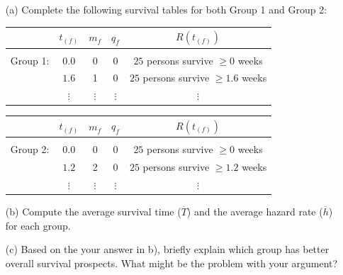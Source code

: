 \documentclass[12pt]{article}
\begin{document}
\begin{itemize}
	\item[(a)] Complete the following survival tables  for both Group 1 and Group 2: \\

\begin{center}
\begin{tabular}{ c c c c c }
 & $t_{(f)}$ & $m_{f}$ & $q_{f}$ & $R(t_{(f)})$ \\
 \hline \\
 Group 1: & $0.0$ & $0$ & $0$ & $25$ persons survive $\geq 0$ weeks \\
 & $1.6$ &1  &0  & $25$ persons survive $\geq 1.6$ weeks \\
 & $\vdots$ & $\vdots$ & $\vdots$ & $\vdots$
\end{tabular}
\end{center}

\begin{center}
\begin{tabular}{ c c c c c }
 & $t_{(f)}$ & $m_{f}$ & $q_{f}$ & $R(t_{(f)})$ \\
 \hline \\
 Group 2: & $0.0$ & $0$ & $0$ & $25$ persons survive $\geq 0$ weeks \\
 & $1.2$ &2  &0  & $25$ persons survive $\geq 1.2$ weeks \\
 & $\vdots$ & $\vdots$ & $\vdots$ & $\vdots$
\end{tabular}
\end{center}

	
	\item[(b)] Compute the average survival time ($\overline{T}$) and the average hazard rate ($\overline{h}$) for each group.
	
	\item[(c)] Based on the your answer in b), briefly explain which group has better overall survival prospects. What might be the problem with your argument?
\end{itemize}
\end{document}
